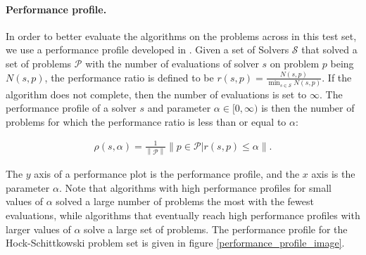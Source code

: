 \documentclass{article}
\begin{document}
\paragraph*{Performance profile.}
\label{performance_profile}
In order to better evaluate the algorithms on the problems across in this test set, we use a performance profile developed in \cite{More:2009:BDO:1654367.1654371}.
Given a set of Solvers $\mathcal S$ that solved a set of problems $\mathcal P$ with the number of evaluations of solver $s$ on problem $p$ being $N(s, p)$, the performance ratio is defined to be $r(s, p) = \frac{N(s, p)}{\min_{s \in \mathcal S} N(s, p)}$.
If the algorithm does not complete, then the number of evaluations is set to $\infty$.
The performance profile of a solver $s$ and parameter $\alpha \in [0, \infty)$ is then the number of problems for which the performance ratio is less than or equal to $\alpha$: 

\begin{align}
\rho(s, \alpha) = \frac 1 {\left\|\mathcal P \right\|} \left\|p \in \mathcal P | r(s, p) \le \alpha\right\|.
\end{align}

The $y$ axis of a performance plot is the performance profile, and the $x$ axis is the parameter $\alpha$.
Note that algorithms with high performance profiles for small values of $\alpha$ solved a large number of problems the most with the fewest evaluations, while algorithms that eventually reach high performance profiles with larger values of $\alpha$ solve a large set of problems.
The performance profile for the Hock-Schittkowski problem set is given in figure \cref{performance_profile_image}.
\end{document}
